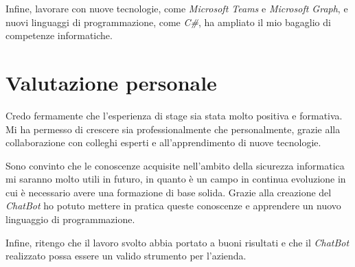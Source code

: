 Infine, lavorare con nuove tecnologie, come \emph{Microsoft Teams} e \emph{Microsoft Graph}, e nuovi linguaggi di programmazione, come \emph{C\#}, ha ampliato il mio bagaglio di competenze informatiche.

\section{Valutazione personale}

Credo fermamente che l'esperienza di stage sia stata molto positiva e formativa.
Mi ha permesso di crescere sia professionalmente che personalmente, grazie alla collaborazione con colleghi esperti e all'apprendimento di nuove tecnologie.

Sono convinto che le conoscenze acquisite nell'ambito della sicurezza informatica mi saranno molto utili in futuro, in quanto è un campo in continua evoluzione in cui è necessario avere una formazione di base solida.
Grazie alla creazione del \emph{ChatBot} ho potuto mettere in pratica queste conoscenze e apprendere un nuovo linguaggio di programmazione.

Infine, ritengo che il lavoro svolto abbia portato a buoni risultati e che il \emph{ChatBot} realizzato possa essere un valido strumento per l'azienda.